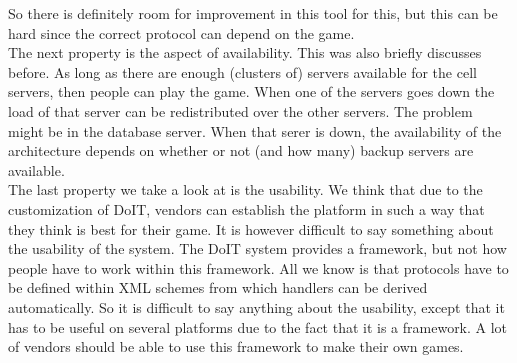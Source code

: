 So there is definitely room for improvement in this tool for this, but this can be hard since the correct protocol can depend on the game.\\
\indent The next property is the aspect of availability. 
This was also briefly discusses before. 
As long as there are enough (clusters of) servers available for the cell servers, then people can play the game. 
When one of the servers goes down the load of that server can be redistributed over the other servers. 
The problem might be in the database server. When that serer is down, the availability of the architecture depends on whether or not (and how many) backup servers are available.\\
The last property we take a look at is the usability.
We think that due to the customization of DoIT, vendors can establish the platform in such a way that they think is best for their game. 
It is however difficult to say something about the usability of the system. 
The DoIT system provides a framework, but not how people have to work within this framework. 
All we know is that protocols have to be defined within XML schemes from which handlers can be derived automatically. 
So it is difficult to say anything about the usability, except that it has to be useful on several platforms due to the fact that it is a framework. 
A lot of vendors should be able to use this framework to make their own games.
